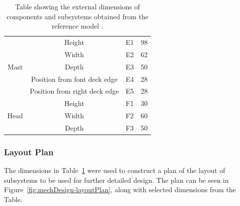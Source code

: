 \begin{table}[h!]
\begin{tabular}{@{}cccc@{}}
      \multirow{5}{*}{Mast}       & Height                        & E1   & 98    \\
                                  & Width                         & E2   & 62    \\
                                  & Depth                         & E3   & 50    \\
                                  & Position from font deck edge  & E4   & 28    \\
                                  & Position from right deck edge & E5   & 28    \\ \midrule
      \multirow{3}{*}{Head}       & Height                        & F1   & 30    \\
                                  & Width                         & F2   & 60    \\
                                  & Depth                         & F3   & 50    \\ \bottomrule
      \end{tabular}
      \caption{Table showing the external dimensions of components and subsystems obtained from the reference model \cite{nasa3Dprint}.}
      \label{tab:design-referenceDimensions}
      \end{table}
      
    \subsubsection{Layout Plan}
      The dimensions in Table~\ref{tab:design-referenceDimensions} were used to construct a plan of the layout of subsystems to be used for further detailed design. The plan can be seen in Figure~\ref{fig:mechDesign-layoutPlan}, along with selected dimensions from the Table.
      
